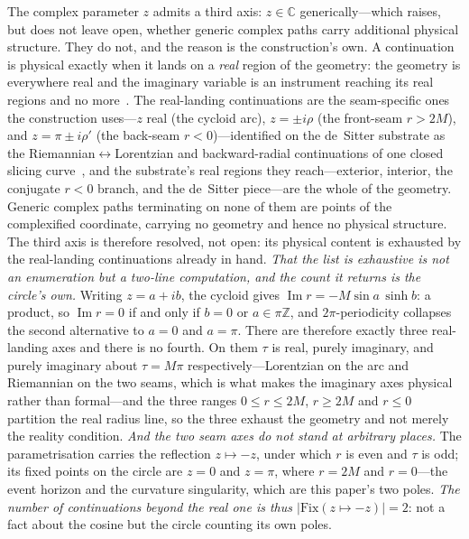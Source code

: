 \documentclass[11pt,a4paper]{article}
\theoremstyle{definition}
\begin{document}
The complex parameter $z$ admits a third axis: $z \in \mathbb{C}$ generically---which raises, but does not leave open, whether generic complex paths carry additional physical structure. They do not, and the reason is the construction's own. A continuation is physical exactly when it lands on a \emph{real} region of the geometry: the geometry is everywhere real and the imaginary variable is an instrument reaching its real regions and no more~\cite{JanzenSlicing,JanzenGeometricCore}. The real-landing continuations are the seam-specific ones the construction uses---$z$ real (the cycloid arc), $z = \pm i\rho$ (the front-seam $r>2M$), and $z = \pi \pm i\rho'$ (the back-seam $r<0$)---identified on the de~Sitter substrate as the Riemannian$\leftrightarrow$Lorentzian and backward-radial continuations of one closed slicing curve~\cite{JanzenSlicing}, and the substrate's real regions they reach---exterior, interior, the conjugate $r<0$ branch, and the de~Sitter piece---are the whole of the geometry. Generic complex paths terminating on none of them are points of the complexified coordinate, carrying no geometry and hence no physical structure. The third axis is therefore resolved, not open: its physical content is exhausted by the real-landing continuations already in hand. \emph{That the list is exhaustive is not an enumeration but a two-line computation, and the count it returns is the circle's own.} Writing $z=a+ib$, the cycloid gives $\operatorname{Im}r = -M\sin a\,\sinh b$: a product, so $\operatorname{Im}r=0$ if and only if $b=0$ or $a\in\pi\mathbb{Z}$, and $2\pi$-periodicity collapses the second alternative to $a=0$ and $a=\pi$. There are therefore exactly three real-landing axes and there is no fourth. On them $\tau$ is real, purely imaginary, and purely imaginary about $\tau=M\pi$ respectively---Lorentzian on the arc and Riemannian on the two seams, which is what makes the imaginary axes physical rather than formal---and the three ranges $0\le r\le 2M$, $r\ge 2M$ and $r\le 0$ partition the real radius line, so the three exhaust the geometry and not merely the reality condition. \emph{And the two seam axes do not stand at arbitrary places.} The parametrisation carries the reflection $z\mapsto-z$, under which $r$ is even and $\tau$ is odd; its fixed points on the circle are $z=0$ and $z=\pi$, where $r=2M$ and $r=0$---the event horizon and the curvature singularity, which are this paper's two poles. \emph{The number of continuations beyond the real one is thus $|\mathrm{Fix}(z\mapsto-z)|=2$}: not a fact about the cosine but the circle counting its own poles.
\end{document}
